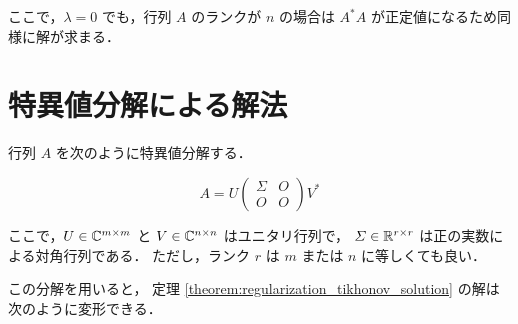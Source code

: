 ここで，$\lambda = 0$ でも，行列 $A$ のランクが $n$ の場合は $A^*A$ が正定値になるため同様に解が求まる．

\section{特異値分解による解法}

行列 $A$ を次のように特異値分解する．

\begin{equation}
    A = U
    \begin{pmatrix}
        \Sigma & O \\
        O      & O
    \end{pmatrix}
    V^*
\end{equation}

ここで，$U \in \mathbb{C}^{m \times m}$ と $V \in \mathbb{C}^{n \times n}$ はユニタリ行列で，
$\varSigma \in \mathbb{R}^{r \times r}$ は正の実数による対角行列である．
ただし，ランク $r$ は $m$ または $n$ に等しくても良い．

この分解を用いると，
定理 \ref{theorem:regularization_tikhonov_solution} の解は次のように変形できる．

